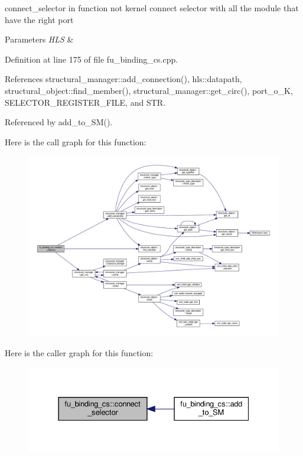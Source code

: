 connect\+\_\+selector in function not kernel connect selector with all the module that have the right port 


\begin{DoxyParams}{Parameters}
{\em H\+LS} & \\
\hline
\end{DoxyParams}


Definition at line 175 of file fu\+\_\+binding\+\_\+cs.\+cpp.



References structural\+\_\+manager\+::add\+\_\+connection(), hls\+::datapath, structural\+\_\+object\+::find\+\_\+member(), structural\+\_\+manager\+::get\+\_\+circ(), port\+\_\+o\+\_\+K, S\+E\+L\+E\+C\+T\+O\+R\+\_\+\+R\+E\+G\+I\+S\+T\+E\+R\+\_\+\+F\+I\+LE, and S\+TR.



Referenced by add\+\_\+to\+\_\+\+S\+M().

Here is the call graph for this function\+:
\nopagebreak
\begin{figure}[H]
\begin{center}
\leavevmode
\includegraphics[width=350pt]{d4/d7b/classfu__binding__cs_a6201940f686fadbcb4915dd44564376b_cgraph}
\end{center}
\end{figure}
Here is the caller graph for this function\+:
\nopagebreak
\begin{figure}[H]
\begin{center}
\leavevmode
\includegraphics[width=331pt]{d4/d7b/classfu__binding__cs_a6201940f686fadbcb4915dd44564376b_icgraph}
\end{center}
\end{figure}
\mbox{\label{classfu__binding__cs_a5d369fddbe9497c80625c619b78e2c9f}} 
